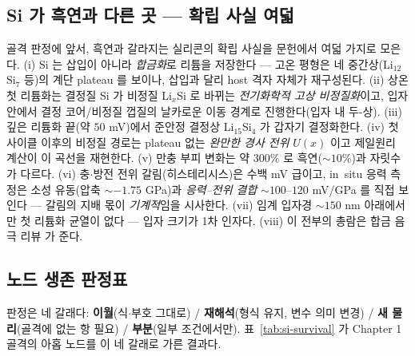 \subsection{Si 가 흑연과 다른 곳 --- 확립 사실 여덟}\label{ssec:si-facts-body}
골격 판정에 앞서, 흑연과 갈라지는 실리콘의 확립 사실을 문헌에서 여덟 가지로 모은다.
(i) Si 는 삽입이 아니라 \emph{합금화}로 리튬을 저장한다 --- 고온 평형은 네 중간상(Li$_{12}$Si$_7$ 등)의
계단 plateau 를 보이나\cite{wen_huggins1981}, 삽입과 달리 host 격자 자체가 재구성된다. (ii) 상온 첫
리튬화는 결정질 Si 가 비정질 Li$_x$Si 로 바뀌는 \emph{전기화학적 고상 비정질화}이고, 입자 안에서 결정
코어/비정질 껍질의 날카로운 이동 경계로 진행한다(입자 내 두-상)\cite{limthongkul2003,li_dahn2007}.
(iii) 깊은 리튬화 끝(약 $50$ mV)에서 준안정 결정상 Li$_{15}$Si$_4$ 가 갑자기
결정화한다\cite{obrovac_christensen2004}. (iv) 첫 사이클 이후의 비정질 경로는 plateau 없는 \emph{완만한
경사 전위} $U(x)$ 이고 제일원리 계산이 이 곡선을 재현한다\cite{chevrier_dahn2009}. (v) 만충 부피
변화는 약 $300\%$ 로\cite{beaulieu2001} 흑연($\sim10\%$)과 자릿수가 다르다. (vi) 충$\cdot$방전 전위
갈림(히스테리시스)은 수백 mV 급이고, in~situ 응력 측정은 소성 유동(압축 $\sim-1.75$ GPa)과
\emph{응력--전위 결합} $\sim100$--$120$ mV/GPa 를 직접 보인다\cite{sethuraman_stressevo2010,%
sethuraman_stresspot2010} --- 갈림의 지배 몫이 \emph{기계적}임을 시사한다. (vii) 임계 입자경
$\sim150$ nm 아래에서만 첫 리튬화 균열이 없다 --- 입자 크기가 1차 인자다\cite{liu_sizefracture2012}.
(viii) 이 전부의 총람은 합금 음극 리뷰\cite{obrovac_chevrier2014} 가 준다.

\subsection{노드 생존 판정표}\label{ssec:si-survival-body}
판정은 네 갈래다: \textbf{이월}(식$\cdot$부호 그대로) / \textbf{재해석}(형식 유지, 변수 의미 변경) /
\textbf{새 물리}(골격에 없는 항 필요) / \textbf{부분}(일부 조건에서만). 표~\ref{tab:si-survival} 가
Chapter 1 골격의 아홉 노드를 이 네 갈래로 가른 결과다.

